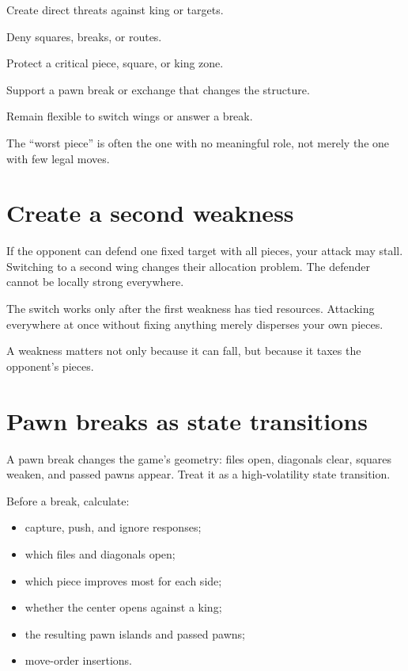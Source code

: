 \begin{description}[style=nextline,leftmargin=2.4em,labelsep=.5em]
\item[Attack.] Create direct threats against king or targets.
\item[Restrict.] Deny squares, breaks, or routes.
\item[Defend.] Protect a critical piece, square, or king zone.
\item[Transform.] Support a pawn break or exchange that changes the structure.
\item[Reserve.] Remain flexible to switch wings or answer a break.
\end{description}

The ``worst piece'' is often the one with no meaningful role, not merely the one with few legal moves.

\section{Create a second weakness}
If the opponent can defend one fixed target with all pieces, your attack may stall. Switching to a second wing changes their allocation problem. The defender cannot be locally strong everywhere.

The switch works only after the first weakness has tied resources. Attacking everywhere at once without fixing anything merely disperses your own pieces.

\begin{intuitionbox}
A weakness matters not only because it can fall, but because it taxes the opponent's pieces.
\end{intuitionbox}

\section{Pawn breaks as state transitions}
A pawn break changes the game's geometry: files open, diagonals clear, squares weaken, and passed pawns appear. Treat it as a high-volatility state transition.

Before a break, calculate:

\begin{itemize}[leftmargin=1.4em]
\item capture, push, and ignore responses;
\item which files and diagonals open;
\item which piece improves most for each side;
\item whether the center opens against a king;
\item the resulting pawn islands and passed pawns;
\item move-order insertions.
\end{itemize}

